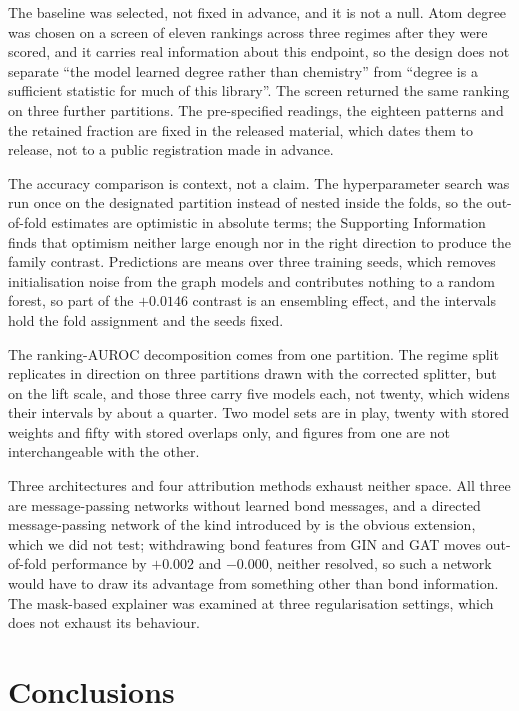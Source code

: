 \documentclass[journal=jcisd8,manuscript=article]{achemso}
\begin{document}
The baseline was selected, not fixed in advance, and it is not a null. Atom degree was chosen
on a screen of eleven rankings across three regimes after they were scored, and it carries
real information about this endpoint, so the design does not separate ``the model learned
degree rather than chemistry'' from ``degree is a sufficient statistic for much of this
library''. The screen returned the same ranking on three further partitions. The
pre-specified readings, the eighteen patterns and the retained fraction are fixed in the
released material, which dates them to release, not to a public registration made in advance.

The accuracy comparison is context, not a claim. The hyperparameter search was run once on
the designated partition instead of nested inside the folds, so the out-of-fold estimates are
optimistic in absolute terms; the Supporting Information finds that optimism neither large
enough nor in the right direction to produce the family contrast. Predictions are means over
three training seeds, which removes initialisation noise from the graph models and
contributes nothing to a random forest, so part of the $+0.0146$ contrast is an ensembling
effect, and the intervals hold the fold assignment and the seeds fixed.

The ranking-AUROC decomposition comes from one partition. The regime split replicates in
direction on three partitions drawn with the corrected splitter, but on the lift scale, and
those three carry five models each, not twenty, which widens their intervals by about a
quarter. Two model sets are in play, twenty with stored weights and fifty with stored
overlaps only, and figures from one are not interchangeable with the other.

Three architectures and four attribution methods exhaust neither space. All three are
message-passing networks without learned bond messages, and a directed message-passing
network of the kind introduced by \citet{yang2019} is the obvious extension, which we did
not test; withdrawing bond features from GIN and GAT moves out-of-fold performance by $+0.002$
and $-0.000$, neither resolved, so such a network would have to draw its advantage from
something other than bond information. The mask-based explainer was examined at three
regularisation settings, which does not exhaust its behaviour.

\section{Conclusions}
\end{document}
